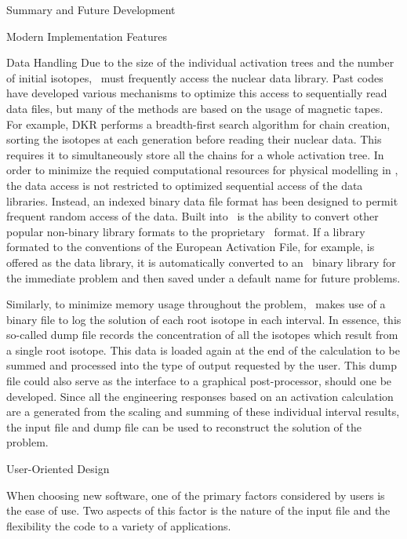 \begin{chapter}{Summary and Future Development}
\begin{section}{Modern Implementation Features\label{sec:summary.modern}}
    \begin{subsection}{Data Handling}
      Due to the size of the individual activation trees and the
      number of initial isotopes, \ALARA\ must frequently access the
      nuclear data library.  Past codes have developed various
      mechanisms to optimize this access to sequentially read data
      files, but many of the methods are based on the usage of
      magnetic tapes.  For example, DKR performs a breadth-first
      search algorithm for chain creation, sorting the isotopes at
      each generation before reading their nuclear data.  This
      requires it to simultaneously store all the chains for a whole
      activation tree.  In order to minimize the requied computational
      resources for physical modelling in \ALARA, the data access is
      not restricted to optimized sequential access of the data
      libraries.  Instead, an indexed binary data file format has been
      designed to permit frequent random access of the data.  Built
      into \ALARA\ is the ability to convert other popular non-binary
      library formats to the proprietary \ALARA\ format.  If a library
      formated to the conventions of the European Activation File, for
      example, is offered as the data library, it is automatically
      converted to an \ALARA\ binary library for the immediate problem
      and then saved under a default name for future problems.

      Similarly, to minimize memory usage throughout the problem,
      \ALARA\ makes use of a binary file to log the solution of each
      root isotope in each interval.  In essence, this so-called dump
      file records the concentration of all the isotopes which result
      from a single root isotope.  This data is loaded again at the
      end of the calculation to be summed and processed into the type
      of output requested by the user.  This dump file could also
      serve as the interface to a graphical post-processor, should one
      be developed.  Since all the engineering responses based on an
      activation calculation are a generated from the scaling and
      summing of these individual interval results, the input file and
      dump file can be used to reconstruct the solution of the problem.
    \end{subsection}
    
    \begin{subsection}{User-Oriented Design}
      
      When choosing new software, one of the primary factors
      considered by users is the ease of use.  Two aspects of this
      factor is the nature of the input file and the flexibility the
      code to a variety of applications.  
      

\end{subsection}
\end{section}
\end{chapter}
